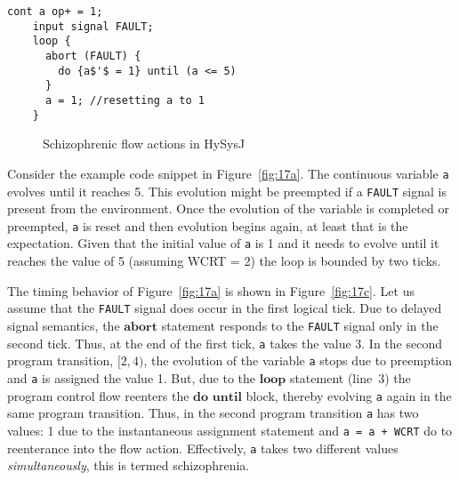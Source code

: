 \documentclass[10pt,journal,cspaper,compsoc]{IEEEtran}
\begin{document}
\newbox{\schone}
\begin{lrbox}{\schone}
  \begin{lstlisting}[mathescape,style=sysj,morekeywords={until,wait_inbetween,
      cont,input,signal,loop,abort,await,emit,present,trap,pause,exit,delay,suspend}]
    cont a op+ = 1;
    input signal FAULT;
    loop {
      abort (FAULT) {
        do {a$'$ = 1} until (a <= 5)
      }
      a = 1; //resetting a to 1
    }
  \end{lstlisting}
\end{lrbox}

\begin{figure}[t!]
  \centering
  \hspace{20pt}
  
  \hspace{20pt}
  \caption{Schizophrenic flow actions in HySysJ}
  \label{fig:17}
\end{figure}

Consider the example code snippet in Figure~\ref{fig:17a}. The
continuous variable \texttt{a} evolves until it reaches 5. This
evolution might be preempted if a \texttt{FAULT} signal is present from
the environment. Once the evolution of the variable is completed or
preempted, \texttt{a} is reset and then evolution begins again, at least
that is the expectation. Given that the initial value of \texttt{a} is 1
and it needs to evolve until it reaches the value of 5 (assuming WCRT =
2) the loop is bounded by two ticks.

The timing behavior of Figure~\ref{fig:17a} is shown in
Figure~\ref{fig:17c}. Let us assume that the \texttt{FAULT} signal does
occur in the first logical tick. Due to delayed signal semantics, the
$\mathbf{abort}$ statement responds to the \texttt{FAULT} signal only in
the second tick. Thus, at the end of the first tick, \texttt{a} takes
the value 3. In the second program transition, $[2,4)$, the evolution of
the variable \texttt{a} stops due to preemption and \texttt{a} is
assigned the value 1. But, due to the $\mathbf{loop}$ statement (line~3)
the program control flow reenters the $\mathbf{do}$ $\mathbf{until}$
block, thereby evolving \texttt{a} again in the same program
transition. Thus, in the second program transition \texttt{a} has two
values: 1 due to the instantaneous assignment statement and \texttt{a =
  a + WCRT} do to reenterance into the flow action. Effectively,
\texttt{a} takes two different values \textit{simultaneously}, this is
termed schizophrenia.
\end{document}
